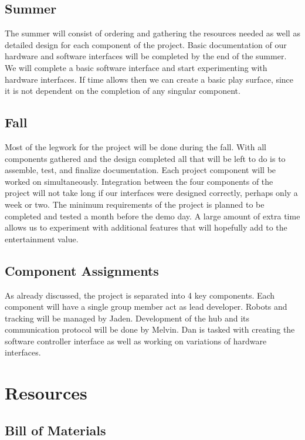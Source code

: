 \documentclass[11pt]{ieeeconf}
\begin{document}
\subsection{Summer}
The summer will consist of ordering and gathering the resources needed as well as detailed design for each component of the project. Basic documentation of our hardware and software interfaces will be completed by the end of the summer. We will complete a basic software interface and start experimenting with hardware interfaces. If time allows then we can create a basic play surface, since it is not dependent on the completion of any singular component.

\subsection{Fall}
Most of the legwork for the project will be done during the fall. With all components gathered and the design completed all that will be left to do is to assemble, test, and finalize documentation. Each project component will be worked on simultaneously. Integration between the four components of the project will not take long if our interfaces were designed correctly, perhaps only a week or two. The minimum requirements of the project is planned to be completed and tested a month before the demo day. A large amount of extra time allows us to experiment with additional features that will hopefully add to the entertainment value.

\subsection{Component Assignments}
As already discussed, the project is separated into 4 key components. Each component will have a single group member act as lead developer. Robots and tracking will be managed by Jaden. Development of the hub and its communication protocol will be done by Melvin. Dan is tasked with creating the software controller interface as well as working on variations of hardware interfaces. 

\section{Resources}
\subsection{Bill of Materials}
\end{document}
